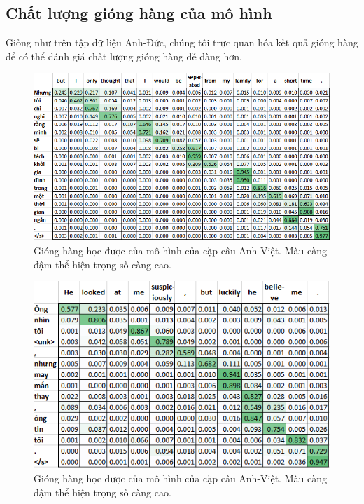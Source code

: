 \subsection{Chất lượng gióng hàng của mô hình}
Giống như trên tập dữ liệu Anh-Đức, chúng tôi trực quan hóa kết quả gióng hàng để có thể đánh giá chất lượng gióng hàng dễ dàng hơn.

\begin{figure}
	\centering
	\includegraphics[width=1.0\textwidth]{en-vi_attn-weights_25.png}
	\caption[Gióng hàng học được của mô hình của cặp câu Anh-Việt.]{Gióng hàng học được của mô hình của cặp câu Anh-Việt. Màu càng đậm thể hiện trọng số càng cao.}
	\label{fig_en-vi_attn-weights_25}
\end{figure}

\begin{figure}
	\centering
	\includegraphics[width=1.0\textwidth]{en-vi_attn-weights_68.png}
	\caption[Gióng hàng học được của mô hình của cặp câu Anh-Việt.]{Gióng hàng học được của mô hình của cặp câu Anh-Việt. Màu càng đậm thể hiện trọng số càng cao.}
	\label{fig_en-vi_attn-weights_68}
\end{figure}

